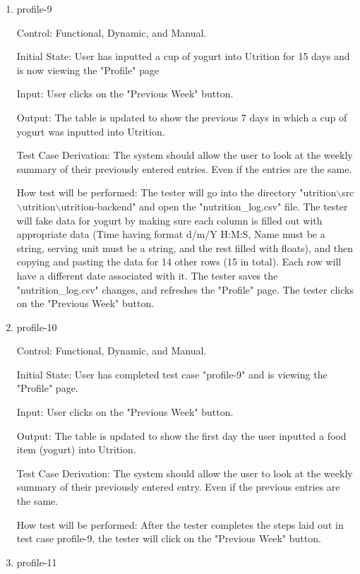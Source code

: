 \documentclass[12pt, titlepage]{article}
\begin{document}
\begin{enumerate}
		\item{profile-9\\}
		
		Control: Functional, Dynamic, and Manual.
		
		Initial State: User has inputted a cup of yogurt into Utrition for 15 days and is now viewing the "Profile" page
		
		Input: User clicks on the "Previous Week" button.
		
		Output: The table is updated to show the previous 7 days in which a cup of yogurt was inputted into Utrition. 
		
		Test Case Derivation: The system should allow the user to look at the weekly summary of their previously entered entries. Even if the entries are the same.
		
		How test will be performed: The tester will go into the directory "utrition$\backslash$src$\backslash$utrition$\backslash$utrition-backend" and open the "nutrition\_log.csv" file. The tester will fake data for yogurt by making sure each column is filled out with appropriate data (Time having format d/m/Y H:M:S, Name must be a string, serving unit must be a string, and the rest filled with floats), and then copying and pasting the data for 14 other rows (15 in total). Each row will have a different date associated with it. The tester saves the "nutrition\_log.csv" changes, and refreshes the "Profile" page. The tester clicks on the "Previous Week" button.
		
		\item{profile-10\\}
		
		Control: Functional, Dynamic, and Manual.
		
		Initial State: User has completed test case "profile-9" and is viewing the "Profile" page.
		
		Input: User clicks on the "Previous Week" button.
		
		Output: The table is updated to show the first day the user inputted a food item (yogurt) into Utrition.
		
		Test Case Derivation: The system should allow the user to look at the weekly summary of their previously entered entry. Even if the previous entries are the same.
		
		How test will be performed: After the tester completes the steps laid out in test case profile-9, the tester will click on the "Previous Week" button.
		
		\item{profile-11\\}
		

\end{enumerate}
\end{document}
